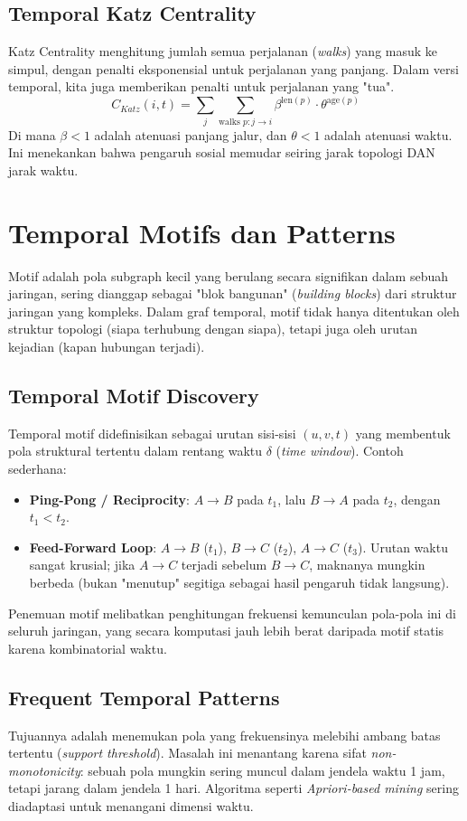 \documentclass[12pt,a4paper]{book}
\begin{document}
\section{Temporal Katz Centrality}
Katz Centrality menghitung jumlah semua perjalanan (\textit{walks}) yang masuk ke simpul, dengan penalti eksponensial untuk perjalanan yang panjang.
Dalam versi temporal, kita juga memberikan penalti untuk perjalanan yang "tua".
$$ C_{Katz}(i, t) = \sum_{j} \sum_{\text{walks } p: j \to i} \beta^{\text{len}(p)} \cdot \theta^{\text{age}(p)} $$
Di mana $\beta < 1$ adalah atenuasi panjang jalur, dan $\theta < 1$ adalah atenuasi waktu. Ini menekankan bahwa pengaruh sosial memudar seiring jarak topologi DAN jarak waktu.

\chapter{Temporal Motifs dan Patterns}
Motif adalah pola subgraph kecil yang berulang secara signifikan dalam sebuah jaringan, sering dianggap sebagai "blok bangunan" (\textit{building blocks}) dari struktur jaringan yang kompleks. Dalam graf temporal, motif tidak hanya ditentukan oleh struktur topologi (siapa terhubung dengan siapa), tetapi juga oleh urutan kejadian (kapan hubungan terjadi).

\section{Temporal Motif Discovery}
Temporal motif didefinisikan sebagai urutan sisi-sisi $(u, v, t)$ yang membentuk pola struktural tertentu dalam rentang waktu $\delta$ (\textit{time window}).
Contoh sederhana:
\begin{itemize}
    \item \textbf{Ping-Pong / Reciprocity}: $A \to B$ pada $t_1$, lalu $B \to A$ pada $t_2$, dengan $t_1 < t_2$.
    \item \textbf{Feed-Forward Loop}: $A \to B$ ($t_1$), $B \to C$ ($t_2$), $A \to C$ ($t_3$). Urutan waktu sangat krusial; jika $A \to C$ terjadi sebelum $B \to C$, maknanya mungkin berbeda (bukan "menutup" segitiga sebagai hasil pengaruh tidak langsung).
\end{itemize}
Penemuan motif melibatkan penghitungan frekuensi kemunculan pola-pola ini di seluruh jaringan, yang secara komputasi jauh lebih berat daripada motif statis karena kombinatorial waktu.

\section{Frequent Temporal Patterns}
Tujuannya adalah menemukan pola yang frekuensinya melebihi ambang batas tertentu (\textit{support threshold}).
Masalah ini menantang karena sifat \textit{non-monotonicity}: sebuah pola mungkin sering muncul dalam jendela waktu 1 jam, tetapi jarang dalam jendela 1 hari. Algoritma seperti \textit{Apriori-based mining} sering diadaptasi untuk menangani dimensi waktu.
\end{document}

